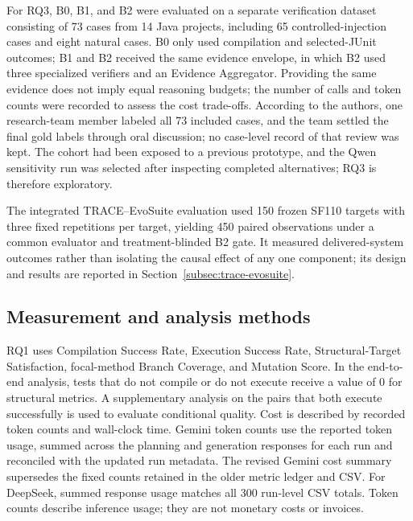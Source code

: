 \documentclass[pdflatex,sn-basic,Numbered,iicol]{sn-jnl}
\begin{document}
For RQ3, B0, B1, and B2 were evaluated on a separate verification dataset consisting of 73 cases from 14 Java projects, including 65 controlled-injection cases and eight natural cases. B0 only used compilation and selected-JUnit outcomes; B1 and B2 received the same evidence envelope, in which B2 used three specialized verifiers and an Evidence Aggregator. Providing the same evidence does not imply equal reasoning budgets; the number of calls and token counts were recorded to assess the cost trade-offs. According to the authors, one research-team member labeled all 73 included cases, and the team settled the final gold labels through oral discussion; no case-level record of that review was kept. The cohort had been exposed to a previous prototype, and the Qwen sensitivity run was selected after inspecting completed alternatives; RQ3 is therefore exploratory.

The integrated TRACE--EvoSuite evaluation used 150 frozen SF110 targets with three fixed repetitions per target, yielding 450 paired observations under a common evaluator and treatment-blinded B2 gate. It measured delivered-system outcomes rather than isolating the causal effect of any one component; its design and results are reported in Section~\ref{subsec:trace-evosuite}.

\subsection{Measurement and analysis methods}\label{subsec:measurement}

RQ1 uses Compilation Success Rate, Execution Success Rate, Structural-Target Satisfaction, focal-method Branch Coverage, and Mutation Score. In the end-to-end analysis, tests that do not compile or do not execute receive a value of 0 for structural metrics. A supplementary analysis on the pairs that both execute successfully is used to evaluate conditional quality. Cost is described by recorded token counts and wall-clock time. Gemini token counts use the reported token usage, summed across the planning and generation responses for each run and reconciled with the updated run metadata. The revised Gemini cost summary supersedes the fixed counts retained in the older metric ledger and CSV. For DeepSeek, summed response usage matches all 300 run-level CSV totals. Token counts describe inference usage; they are not monetary costs or invoices.
\end{document}
